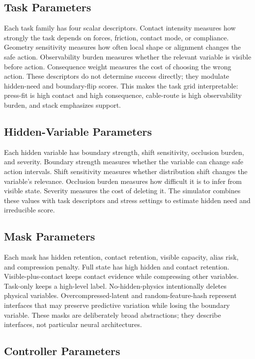 \documentclass{article}
\begin{document}
\subsection{Task Parameters}

Each task family has four scalar descriptors. Contact intensity measures how
strongly the task depends on forces, friction, contact mode, or compliance.
Geometry sensitivity measures how often local shape or alignment changes the
safe action. Observability burden measures whether the relevant variable is
visible before action. Consequence weight measures the cost of choosing the
wrong action. These descriptors do not determine success directly; they modulate
hidden-need and boundary-flip scores. This makes the task grid interpretable:
press-fit is high contact and high consequence, cable-route is high observability
burden, and stack emphasizes support.

\subsection{Hidden-Variable Parameters}

Each hidden variable has boundary strength, shift sensitivity, occlusion burden,
and severity. Boundary strength measures whether the variable can change safe
action intervals. Shift sensitivity measures whether distribution shift changes
the variable's relevance. Occlusion burden measures how difficult it is to infer
from visible state. Severity measures the cost of deleting it. The simulator
combines these values with task descriptors and stress settings to estimate
hidden need and irreducible score.

\subsection{Mask Parameters}

Each mask has hidden retention, contact retention, visible capacity, alias risk,
and compression penalty. Full state has high hidden and contact retention.
Visible-plus-contact keeps contact evidence while compressing other variables.
Task-only keeps a high-level label. No-hidden-physics intentionally deletes
physical variables. Overcompressed-latent and random-feature-hash represent
interfaces that may preserve predictive variation while losing the boundary
variable. These masks are deliberately broad abstractions; they describe
interfaces, not particular neural architectures.

\subsection{Controller Parameters}
\end{document}
